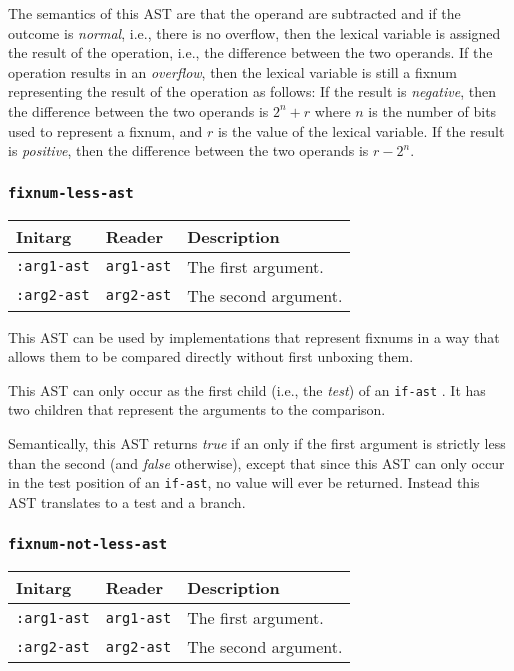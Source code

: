 The semantics of this AST are that the operand are subtracted and if
the outcome is \emph{normal}, i.e., there is no overflow, then the
lexical variable is assigned the result of the operation, i.e., the
difference between the two operands.  If the operation results in an
\emph{overflow}, then the lexical variable is still a fixnum
representing the result of the operation as follows: If the result is
\emph{negative}, then the difference between the two operands is $2^n
+ r$ where $n$ is the number of bits used to represent a fixnum, and
$r$ is the value of the lexical variable.  If the result is
\emph{positive}, then the difference between the two operands is $r -
2^n$.

\subsubsection{\texttt{fixnum-less-ast}}
\label{fixnum-less-ast}

\begin{tabular}{|l|l|l|}
\hline
Initarg & Reader & Description\\
\hline\hline
\texttt{:arg1-ast} & \texttt{arg1-ast} & The first argument.\\
\hline
\texttt{:arg2-ast} & \texttt{arg2-ast} & The second argument.\\
\hline
\end{tabular}

This AST can be used by implementations that represent fixnums in a
way that allows them to be compared directly without first unboxing
them.

This AST can only occur as the first child (i.e., the \emph{test}) of
an \texttt{if-ast} .  It has two children that
represent the arguments to the comparison.

Semantically, this AST returns \emph{true} if an only if the first
argument is strictly less than the second (and \emph{false}
otherwise), except that since this AST can only occur in the test
position of an \texttt{if-ast}, no value will ever be returned.
Instead this AST translates to a test and a branch.

\subsubsection{\texttt{fixnum-not-less-ast}}
\label{fixnum-not-less-ast}

\begin{tabular}{|l|l|l|}
\hline
Initarg & Reader & Description\\
\hline\hline
\texttt{:arg1-ast} & \texttt{arg1-ast} & The first argument.\\
\hline
\texttt{:arg2-ast} & \texttt{arg2-ast} & The second argument.\\
\hline
\end{tabular}


